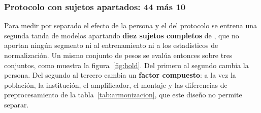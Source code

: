 \subsubsection{Protocolo con sujetos apartados: 44 más 10}

Para medir por separado el efecto de la persona y el del protocolo se entrena una segunda
tanda de modelos apartando \textbf{diez sujetos completos} de \openbmi{}, que no aportan
ningún segmento ni al entrenamiento ni a los estadísticos de normalización. Un mismo
conjunto de pesos se evalúa entonces sobre tres conjuntos, como muestra la
figura~\ref{fig:hold}. Del primero al segundo cambia la persona. Del segundo al tercero
cambia un \textbf{factor compuesto}: a la vez la población, la institución, el amplificador,
el montaje y las diferencias de preprocesamiento de la tabla~\ref{tab:armonizacion}, que
este diseño no permite separar.

